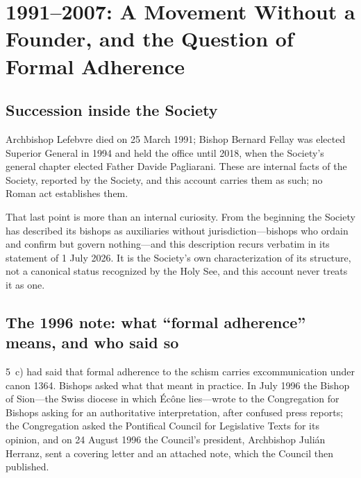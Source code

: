 \section{1991--2007: A Movement Without a Founder, and the Question of
Formal Adherence}

\subsection{Succession inside the Society}

Archbishop Lefebvre died on 25 March 1991; Bishop Bernard Fellay was
elected Superior General in 1994 and held the office until 2018, when the
Society's general chapter elected Father Davide Pagliarani. These are
internal facts of the Society, reported by the Society, and this account
carries them as such; no Roman act establishes them.

That last point is more than an internal curiosity. From the beginning
the Society has described its bishops as auxiliaries without
jurisdiction---bishops who ordain and confirm but govern nothing---and
this description recurs verbatim in its statement of 1 July 2026. It is
the Society's own characterization of its structure, not a canonical
status recognized by the Holy See, and this account never treats it as
one.

\subsection{The 1996 note: what ``formal adherence'' means, and who said so}

 5~c) had said that formal adherence to the schism
carries excommunication under canon 1364. Bishops asked what that meant
in practice. In July 1996 the Bishop of Sion---the Swiss diocese in which
Écône lies---wrote to the Congregation for Bishops asking for an
authoritative interpretation, after confused press reports; the
Congregation asked the Pontifical Council for Legislative Texts for its
opinion, and on 24 August 1996 the Council's president, Archbishop Julián
Herranz, sent a covering letter and an attached note, which the Council
then published.

